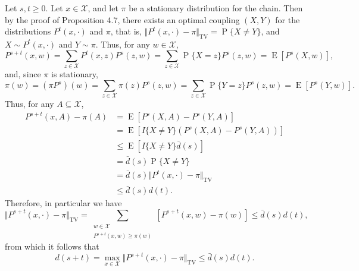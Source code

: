 \documentclass[12pt]{article}
\DeclareMathOperator{\E}{E}
\DeclareMathOperator{\Prob}{P}
\begin{document}
Let $s, t \geq 0$. Let $x \in \mathcal{X}$, and let $\pi$ be a stationary distribution for the chain. Then by the proof of Proposition 4.7, there exists an optimal coupling $(X, Y)$ for the distributions $P^t(x, \cdot)$ and $\pi$, that is, $\Vert P^t(x, \cdot) - \pi \Vert_\mathrm{TV} = \Prob\{X \neq Y\}$, and $X \sim P^t(x, \cdot)$ and $Y \sim \pi$. Thus, for any $w \in \mathcal{X}$,
\begin{equation*}
P^{s+t}(x, w) = \sum_{z \in \mathcal{X}} P^t(x, z) P^s(z, w) = \sum_{z \in \mathcal{X}} \Prob\{X = z\} P^s(z, w) = \E[P^s(X, w)],
\end{equation*}
and, since $\pi$ is stationary,
\begin{equation*}
\pi(w) = (\pi P^s)(w) = \sum_{z \in \mathcal{X}} \pi(z) P^s(z, w) = \sum_{z \in \mathcal{X}} \Prob\{Y = z\} P^s(z, w) = \E[P^s(Y, w)].
\end{equation*}
Thus, for any $A \subseteq \mathcal{X}$,
\begin{align*}
P^{s+t}(x, A) - \pi(A) &= \E[P^s(X, A) - P^s(Y, A)] \\
&= \E[I\{X \neq Y\}(P^s(X, A) - P^s(Y, A))] \\
&\leq \E[I\{X \neq Y\} \bar{d}(s)] \\
&= \bar{d}(s) \Prob\{X \neq Y\} \\
&= \bar{d}(s) \Vert P^t(x, \cdot) - \pi \Vert_\mathrm{TV} \\
&\leq \bar{d}(s) d(t).
\end{align*}
Therefore, in particular we have
\begin{equation*}
\Vert P^{s+t}(x, \cdot) - \pi \Vert_\mathrm{TV} = \sum_{\substack{w \in \mathcal{X} \\ P^{s+t}(x, w) \geq \pi(w)}} [P^{s+t}(x, w) - \pi(w)] \leq \bar{d}(s) d(t),
\end{equation*}
from which it follows that
\begin{equation*}
d(s+t) = \max_{x \in \mathcal{X}} \Vert P^{s+t}(x, \cdot) - \pi \Vert_\mathrm{TV} \leq \bar{d}(s) d(t).
\end{equation*}
\end{document}
